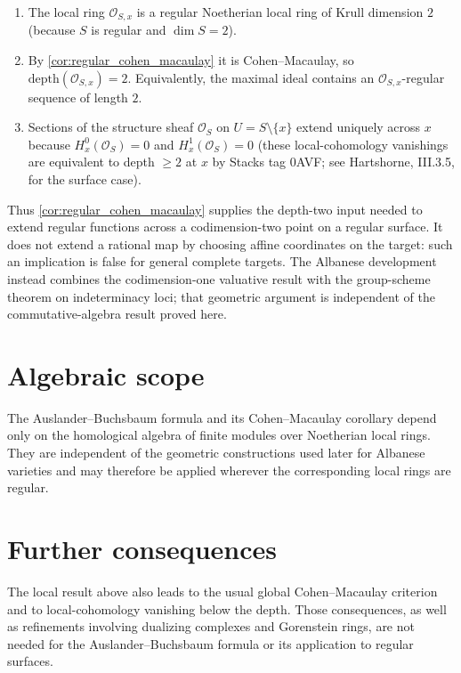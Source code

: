 \begin{enumerate}
  \item The local ring \(\mathcal{O}_{S,x}\) is a regular Noetherian local ring of Krull
    dimension \(2\) (because \(S\) is regular and \(\dim S = 2\)).
  \item By \cref{cor:regular_cohen_macaulay} it is Cohen--Macaulay, so
    \(\text{depth}(\mathcal{O}_{S,x}) = 2\). Equivalently, the maximal ideal contains an
    \(\mathcal{O}_{S,x}\)-regular sequence of length \(2\).
  \item Sections of the structure sheaf \(\mathcal{O}_S\) on \(U = S \setminus \{x\}\) extend
    uniquely across \(x\) because \(H^0_x(\mathcal{O}_S) = 0\) and
    \(H^1_x(\mathcal{O}_S) = 0\) (these local-cohomology vanishings are equivalent to depth
    \(\geq 2\) at \(x\) by Stacks tag 0AVF; see Hartshorne, III.3.5, for the surface case).
\end{enumerate}

Thus \cref{cor:regular_cohen_macaulay} supplies the depth-two input needed to extend regular
functions across a codimension-two point on a regular surface.  It does not extend a rational map
by choosing affine coordinates on the target: such an implication is false for general complete
targets.  The Albanese development instead combines the codimension-one valuative result with the
group-scheme theorem on indeterminacy loci; that geometric argument is independent of the
commutative-algebra result proved here.

\section{Algebraic scope}
\label{sec:ab_lean_encoding}

The Auslander--Buchsbaum formula and its Cohen--Macaulay corollary depend
only on the homological algebra of finite modules over Noetherian local
rings. They are independent of the geometric constructions used later for
Albanese varieties and may therefore be applied wherever the corresponding
local rings are regular.

\section{Further consequences}
\label{sec:ab_out_of_scope}

The local result above also leads to the usual global Cohen--Macaulay
criterion and to local-cohomology vanishing below the depth. Those
consequences, as well as refinements involving dualizing complexes and
Gorenstein rings, are not needed for the Auslander--Buchsbaum formula or
its application to regular surfaces.
